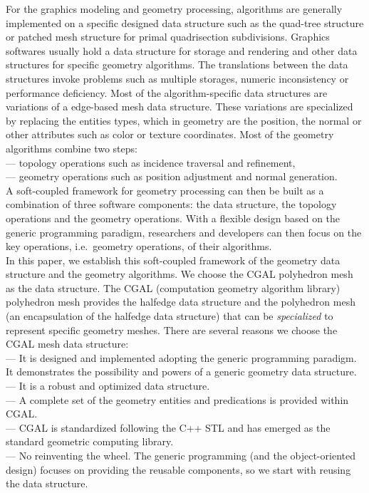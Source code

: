For the graphics modeling and geometry processing, algorithms are
generally implemented on a specific designed data structure such as
the quad-tree structure \cite{} or patched mesh structure \cite{} for
primal quadrisection subdivisions. Graphics softwares usually hold a
data structure for storage and rendering and other data structures for
specific geometry algorithms. The translations between the data
structures invoke problems such as multiple storages, numeric
inconsistency or performance deficiency.  Most of the
algorithm-specific data structures are variations of a edge-based mesh
data structure.  These variations are specialized by replacing the
entities types, which in geometry are the position, the normal or
other attributes such as color or texture coordinates. Most of the
geometry algorithms combine two steps: \\
\indent --- topology operations such as incidence traversal and refinement,\\
\indent --- geometry operations such as position adjustment and normal generation.\\ 
\noindent A soft-coupled framework for geometry processing can then be built
as a combination of three software components: the data structure, the
topology operations and the geometry operations. With a flexible
design based on the generic programming paradigm, researchers and
developers can then focus on the key operations, i.e.\ geometry
operations, of their algorithms.\\

In this paper, we establish this soft-coupled framework of the
geometry data structure and the geometry algorithms. We choose the
CGAL polyhedron mesh as the data structure. The CGAL (computation
geometry algorithm library) polyhedron mesh provides the halfedge data
structure and the polyhedron mesh (an encapsulation of the halfedge
data structure) that can be \emph{specialized} to represent specific
geometry meshes. There are several reasons we choose the CGAL mesh
data structure:\\
\indent --- It is designed and implemented adopting the
generic programming paradigm. It demonstrates the possibility
and powers of a generic geometry data structure.\\
\indent --- It is a robust and optimized data structure.\\
\indent --- A complete set of the geometry entities and predications 
is provided within CGAL.\\
\indent --- CGAL is standardized following the C++ STL and has emerged
as the standard geometric computing library.\\
\indent --- No reinventing the wheel. The generic programming
(and the object-oriented design) focuses on providing the
reusable components, so we start with reusing the data structure.\\

